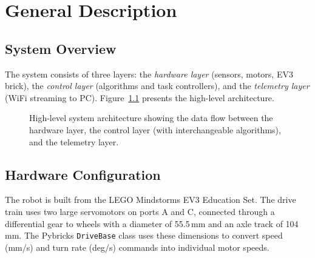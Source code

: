 \chapter{General Description}
\label{ch:general-description}

\section{System Overview}
\label{sec:system-overview}

The system consists of three layers: the \textit{hardware layer} (sensors, motors, EV3 brick), the \textit{control layer} (algorithms and task controllers), and the \textit{telemetry layer} (WiFi streaming to PC). Figure~\ref{fig:system-diagram} presents the high-level architecture.

\begin{figure}[htbp]
    \centering
    \caption{High-level system architecture showing the data flow between the hardware layer, the control layer (with interchangeable algorithms), and the telemetry layer.}
    \label{fig:system-diagram}
\end{figure}

\section{Hardware Configuration}
\label{sec:hardware}

The robot is built from the LEGO Mindstorms EV3 Education Set. The drive train uses two large servomotors on ports A and C, connected through a differential gear to wheels with a diameter of 55.5\,mm and an axle track of 104\,mm. The Pybricks \texttt{DriveBase} class uses these dimensions to convert speed (mm/s) and turn rate (deg/s) commands into individual motor speeds.

